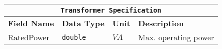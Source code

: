 \begin{tabular}{ l p{3cm} l p{8cm}} 
    \hline
    \multicolumn{4}{c}{\texttt{Transformer Specification}}\\
    \hline
    \textbf{Field Name} & \textbf{Data Type}        & \textbf{Unit} & \textbf{Description} \\
    \hline
    RatedPower          & \texttt{double}           & $VA$          & Max. operating power\\              
   \end{tabular}

\vspace{1cm}
